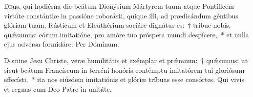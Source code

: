 \documentclass[vesperale_romanum.tex]{subfiles}
\begin{document}



\oratio

\lettrine{D}{e}us, qui hodiérna die beátum Dionýsium Mártyrem tuum atque Pontíficem virtúte constántiæ in passióne roborásti, quique illi, ad prædicándum géntibus glóriam tuam, Rústicum et Eleuthérium sociáre dignátus es:~† tríbue nobis, quǽsumus: eórum imitatióne, pro amóre tuo próspera mundi despícere,~* et nulla ejus advérsa formidáre.
Per Dóminum.

\commsequentis

\myrule


\semiduplexmtv

\oratio

\lettrine{D}{o}mine Jesu Christe, veræ humilitátis et exémplar et prǽmium:~† quǽsumus; ut sicut beátum Francíscum in terréni honóris contémptu imitatórem tui gloriósum effecísti,~* ita nos eiúsdem imitatiónis et glóriæ tríbuas esse consórtes.
Qui vivis et regnas cum Deo Patre in unitáte.


\myrule











\end{document}
